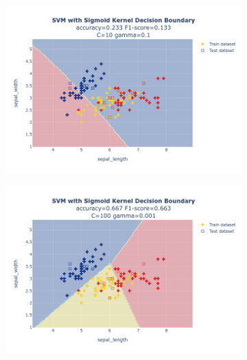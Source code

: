 \documentclass{article}
\begin{document}
\begin{figure}
\begin{subfigure}{0.3\textwidth}
        \includegraphics[scale=.13]{images/implementation/q1/sigmoid_kernel/sepal_length_sepal_width_10_0.1.png}
    \end{subfigure}
    \newline
    \begin{subfigure}{0.3\textwidth}
        \centering
        \includegraphics[scale=.13]{images/implementation/q1/sigmoid_kernel/sepal_length_sepal_width_100_0.001.png}
    \end{subfigure}
    \hfill
    \begin{subfigure}{0.3\textwidth}
        \centering

\end{subfigure}
\end{figure}
\end{document}
